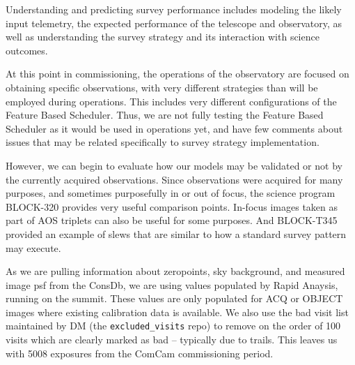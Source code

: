 Understanding and predicting survey performance includes modeling the likely input telemetry, the expected performance of the telescope and observatory, as well as understanding the survey strategy and its interaction with science outcomes.

At this point in commissioning, the operations of the observatory are focused on obtaining specific observations, with very different strategies than will be employed during operations. This includes very different configurations of the Feature Based Scheduler. Thus, we are not fully testing the Feature Based Scheduler as it would be used in operations yet, and have few comments about issues that may be related specifically to survey strategy implementation. 

However, we can begin to evaluate how our models may be validated or not by the currently acquired observations. Since observations were acquired for many purposes, and sometimes purposefully in or out of focus, the science program BLOCK-320 provides very useful comparison points. In-focus images taken as part of AOS triplets can also be useful for some purposes. And BLOCK-T345 provided an example of slews that are similar to how a standard survey pattern may execute. 

As we are pulling information about zeropoints, sky background, and measured image psf from the ConsDb, we are using values populated by Rapid Anaysis, running on the summit. These values are only populated for ACQ or OBJECT images where existing calibration data is available. We also use the bad visit list maintained by DM (the \texttt{excluded\_visits} repo) to remove on the order of 100 visits which are clearly marked as bad -- typically due to trails. This leaves us with 5008 exposures from the ComCam commissioning period.


